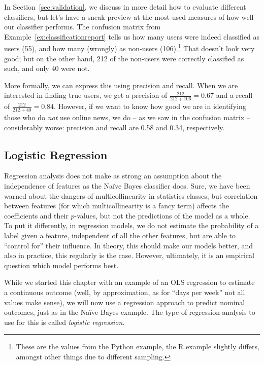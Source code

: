 In Section~\ref{sec:validation}, we discuss in more detail how to
evaluate different classifiers, but let's have a sneak preview at the most used
measures of how well our classifier performs.
The confusion matrix from Example~\ref{ex:classificationreport} tells us how many users were indeed
classified as users (55), and how many (wrongly) as non-users
(106).\footnote{These are the values from the Python example, the R
  example slightly differs, amongst other things due to different
  sampling.} That doesn't look very good; but on the other hand, 212
of the non-users were correctly classified as such, and only 40 were
not.

More formally, we can express this using precision and recall. When we
are interested in finding true users, we get a precision of $\frac{212}{212+106} = 0.67$
 and a recall of $\frac{212}{212+40} = 0.84$.
However, if we want to know how good we are in identifying those who
do \emph{not} use online news, we do -- as we saw in the confusion
matrix -- considerably worse: precision and recall are 0.58 and 0.34,
respectively.



\subsection{Logistic Regression} \label{subsec: Logistic Regression}

Regression analysis does not make as strong an assumption about the
independence of features as the Na\"ive Bayes classifier does.  Sure,
we have been warned about the dangers of multicollinearity in
statistics classes, but correlation between features (for which
multicollinearity is a fancy term) affects the coefficients and their
$p$-values, but not the predictions of the model as a whole.   To put
it differently, in regression models, we do not estimate the
probability of a label given a feature, independent of all the other
features, but are able to ``control for'' their influence.  In theory,
this should make our models better, and also in practice, this
regularly is the case. However, ultimately, it is an empirical
question which model performs best.

While we started this chapter with an example of an OLS regression to
estimate a continuous outcome (well, by approximation, as for ``days
per week'' not all values make sense), we will now use a regression
approach to predict nominal outcomes, just as in the Na\"ive Bayes
example.  The type of regression analysis to use for this is called
\emph{logistic regression}.

